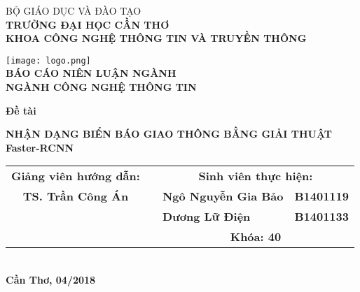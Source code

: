 \documentclass[../thesis.tex]{subfiles}
\begin{document}
\begin{titlepage}

\begin{center}

BỘ GIÁO DỤC VÀ ĐÀO TẠO\\
\textbf{TRƯỜNG ĐẠI HỌC CẦN THƠ\\}
\textbf{KHOA CÔNG NGHỆ THÔNG TIN VÀ TRUYỀN THÔNG\\[1cm]}

\texttt{[image: logo.png]}\\[1cm]

\textbf{BÁO CÁO NIÊN LUẬN NGÀNH\\}
\textbf{NGÀNH CÔNG NGHỆ THÔNG TIN\\[2cm]}

\begin{large}
\textbf{Đề tài\\[0.5cm]}
\end{large}
\textbf{{\LARGE NHẬN DẠNG BIỂN BÁO GIAO THÔNG BẰNG GIẢI THUẬT Faster-RCNN}}
\\[3.5cm]

\begin{tabular}{ c c l l }
	 \textbf{Giảng viên hướng dẫn:} & & \multicolumn{2}{c}{\textbf{Sinh viên thực hiện:}}\\
	 \textbf{TS. Trần Công Án} & & \textbf{Ngô Nguyễn Gia Bảo} &
	 \textbf{B1401119}\\
	 & & \textbf{Dương Lữ Điện} & \textbf{B1401133}\\
	 & & \multicolumn{2}{c}{\textbf{Khóa: 40}}
\end{tabular}
\\[4cm]

\textbf{Cần Thơ, 04/2018}

\end{center}

\end{titlepage}
\end{document}
